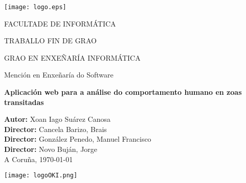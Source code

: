 \begin{titlepage}
\begin{center}

\texttt{[image: logo.eps]}

\vspace{0.5cm}
FACULTADE DE INFORMÁTICA

\vspace*{1cm}

\Large{TRABALLO FIN DE GRAO}

\Large{GRAO EN ENXEÑARÍA INFORMÁTICA}

Mención en Enxeñaría do Software

\vspace*{2cm}

\textbf{\LARGE{Aplicación web para a análise do comportamento humano en zoas transitadas}}

\end{center}

\vspace*{4cm}

\begin{flushright}
\large{
\textbf{Autor:} Xoan Iago Suárez Canosa\\
\textbf{Director:} Cancela Barizo, Brais \\
\textbf{Director:} González Penedo, Manuel Francisco \\
\textbf{Director:} Novo Buján, Jorge \\
\vspace{0.5cm}
A Coruña, \today}
\end{flushright}

\begin{flushleft}
 \texttt{[image: logoOKI.png]}
\end{flushleft}


\end{titlepage}
